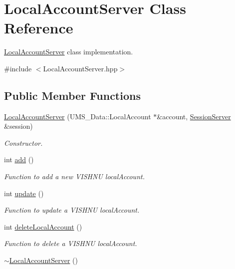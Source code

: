 \hypertarget{classLocalAccountServer}{
\section{LocalAccountServer Class Reference}
\label{classLocalAccountServer}
}


\hyperlink{classLocalAccountServer}{LocalAccountServer} class implementation.  




{\ttfamily \#include $<$LocalAccountServer.hpp$>$}

\subsection*{Public Member Functions}
\begin{DoxyCompactItemize}
\item 
\hyperlink{classLocalAccountServer_ac7397f6bc278ea36788bb97340b92f88}{LocalAccountServer} (UMS\_\-Data::LocalAccount $\ast$\&account, \hyperlink{classSessionServer}{SessionServer} \&session)
\begin{DoxyCompactList}\small\item\em Constructor. \item\end{DoxyCompactList}\item 
int \hyperlink{classLocalAccountServer_aafbc4994794b98375146fbaf398986ab}{add} ()
\begin{DoxyCompactList}\small\item\em Function to add a new VISHNU localAccount. \item\end{DoxyCompactList}\item 
int \hyperlink{classLocalAccountServer_a106360dbde0601ccb4d59a0348a654e4}{update} ()
\begin{DoxyCompactList}\small\item\em Function to update a VISHNU localAccount. \item\end{DoxyCompactList}\item 
int \hyperlink{classLocalAccountServer_a1d79f9b073ec95f09d2f34e29b5f9053}{deleteLocalAccount} ()
\begin{DoxyCompactList}\small\item\em Function to delete a VISHNU localAccount. \item\end{DoxyCompactList}\item 
\hypertarget{classLocalAccountServer_a07799fc2f2411379c43c5d9015ea0b13}{
\hyperlink{classLocalAccountServer_a07799fc2f2411379c43c5d9015ea0b13}{$\sim$LocalAccountServer} ()}
\label{classLocalAccountServer_a07799fc2f2411379c43c5d9015ea0b13}


\end{DoxyCompactItemize}
